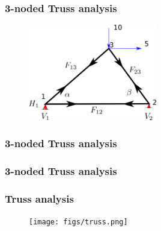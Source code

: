 \documentclass[notes]{beamer}
\begin{document}
\begin{frame}
	\frametitle{3-noded Truss analysis}
	\begin{figure}[ht]
		\centering
		\includegraphics[width=0.5\textwidth]{figs/3truss.png}
	\end{figure}
	\vspace{4cm}
\end{frame}


\begin{frame}
	\frametitle{3-noded Truss analysis}
	\vspace{4cm}
\end{frame}

\begin{frame}
	\frametitle{3-noded Truss analysis}
	\vspace{4cm}
\end{frame}



\begin{frame}
	\frametitle{Truss analysis}
	\begin{figure}[ht]
		\centering
		\texttt{[image: figs/truss.png]}
	\end{figure}
\end{frame}
\end{document}
